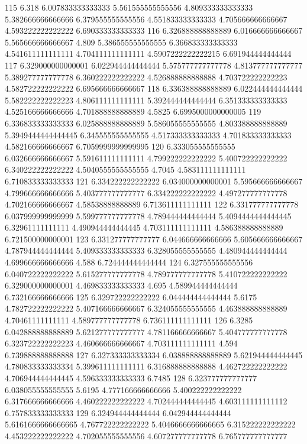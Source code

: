 115 6.318 6.007833333333333 5.561555555555556 4.809333333333333 5.382666666666666 6.379555555555556 4.551833333333333 4.705666666666667 4.593222222222222 6.690333333333333
116 6.326888888888889 6.016666666666667 5.565666666666667 4.809 5.386555555555555 6.366833333333333 4.541611111111111 4.704111111111111 4.5907222222222215 6.691944444444444
117 6.329000000000001 6.022944444444444 5.575777777777778 4.813777777777777 5.389277777777778 6.360222222222222 4.526888888888888 4.703722222222223 4.582722222222222 6.695666666666667
118 6.336388888888889 6.022444444444444 5.582222222222223 4.806111111111111 5.392444444444444 6.351333333333333 4.525166666666666 4.701888888888889 4.5825 6.6995000000000005
119 6.336833333333333 6.025888888888889 5.586055555555555 4.803388888888889 5.3949444444444445 6.345555555555555 4.517333333333333 4.701833333333333 4.582166666666667 6.7059999999999995
120 6.333055555555555 6.032666666666667 5.591611111111111 4.799222222222222 5.400722222222222 6.340222222222222 4.5040555555555555 4.7045 4.583111111111111 6.710833333333333
121 6.334222222222222 6.034000000000001 5.595666666666667 4.799666666666666 5.403777777777777 6.334222222222222 4.497277777777778 4.702166666666667 4.58538888888889 6.713611111111111
122 6.331777777777778 6.037999999999999 5.599777777777778 4.789444444444444 5.4094444444444445 6.32961111111111 4.490944444444445 4.703111111111111 4.586388888888889 6.721500000000001
123 6.331277777777777 6.044666666666666 5.605666666666667 4.787944444444444 5.409333333333333 6.328055555555555 4.480944444444444 4.699666666666666 4.588 6.724444444444444
124 6.327555555555556 6.040722222222222 5.615277777777778 4.789777777777778 5.410722222222222 6.329000000000001 4.469833333333333 4.695 4.589944444444444 6.732166666666666
125 6.329722222222222 6.044444444444444 5.6175 4.782722222222222 5.407166666666667 6.324055555555555 4.463888888888889 4.70461111111111 4.589777777777778 6.736111111111111
126 6.3285 6.042888888888889 5.621277777777777 4.781166666666667 5.404777777777778 6.323722222222223 4.460666666666667 4.703111111111111 4.594 6.739888888888888
127 6.327333333333334 6.038888888888889 5.621944444444445 4.780833333333334 5.399611111111111 6.316888888888888 4.462722222222222 4.706944444444445 4.596333333333333 6.7485
128 6.323777777777777 6.038055555555555 5.6195 4.777166666666666 5.400222222222222 6.317666666666666 4.460222222222222 4.702444444444445 4.603111111111112 6.757833333333333
129 6.324944444444444 6.042944444444444 5.6161666666666665 4.767722222222222 5.4046666666666665 6.315222222222222 4.453222222222222 4.702055555555556 4.607277777777778 6.765777777777777
